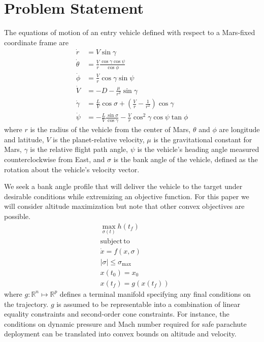 \documentclass[letterpaper, preprint, paper,11pt]{AAS}	%
\begin{document}
	\section{Problem Statement}
	The equations of motion of an entry vehicle defined with respect to a Mars-fixed coordinate frame are 
	\begin{align}
	\dot{r} &= V\sin\gamma\\
	\dot{\theta} &= \frac{V}{r}\frac{\cos\gamma\cos\psi}{\cos\phi}\\
	\dot{\phi} &= \frac{V}{r}\cos\gamma\sin\psi \\
	\dot{V} &= -D - \frac{\mu}{r^2}\sin\gamma \\
	\dot{\gamma} &= \frac{L}{V}\cos\sigma + \left(\frac{V}{r}-\frac{1}{r^2}\right)\cos\gamma \\
	\dot{\psi} &= -\frac{L}{V}\frac{\sin\sigma}{\cos\gamma} - \frac{V}{r}\cos^2\gamma\cos\psi\tan\phi %
	\end{align}
	where $r$ is the radius of the vehicle from the center of Mars, $\theta$ and $\phi$ are longitude and latitude, $V$ is the planet-relative velocity, $\mu$ is the gravitational constant for Mars, $\gamma$ is the relative flight path angle, $\psi$ is the vehicle's heading angle measured counterclockwise from East, and $\sigma$ is the bank angle of the vehicle, defined as the rotation about the vehicle's velocity vector. 
	
	
%	
	
	We seek a bank angle profile that will deliver the vehicle to the target under desirable conditions while extremizing an objective function. For this paper we will consider altitude maximization but note that other convex objectives are possible.
	\begin{align}
		&\max_{\sigma(t)} h(t_f) \label{eq_objective}\\
		&\mathrm{subject\,to\,} \nonumber\\ 
		&\dot{x} = f(x, \sigma) \\
		&|\sigma| \le \sigma_{\max} \\
		&x(t_0) = x_0 \label{eq_initial_cond}\\
		&x(t_f) = g(x(t_f)) \label{eq_terminal_cond}
	\end{align} 
	where $g:\mathbb{R}^n\mapsto\mathbb{R}^p$ defines a terminal manifold specifying any final conditions on the trajectory. $g$ is assumed to be representable into a combination of linear equality constraints and second-order cone constraints. For instance, the conditions on dynamic pressure and Mach number required for safe parachute deployment can be translated into convex bounds on altitude and velocity. 
	
\end{document}
